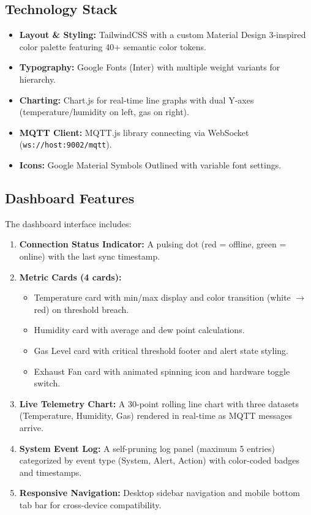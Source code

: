 \documentclass[12pt,a4paper]{report}
\begin{document}
\subsection{Technology Stack}
\begin{itemize}
    \item \textbf{Layout \& Styling:} TailwindCSS with a custom Material Design 3-inspired color palette featuring 40+ semantic color tokens.
    \item \textbf{Typography:} Google Fonts (Inter) with multiple weight variants for hierarchy.
    \item \textbf{Charting:} Chart.js for real-time line graphs with dual Y-axes (temperature/humidity on left, gas on right).
    \item \textbf{MQTT Client:} MQTT.js library connecting via WebSocket (\texttt{ws://host:9002/mqtt}).
    \item \textbf{Icons:} Google Material Symbols Outlined with variable font settings.
\end{itemize}

\subsection{Dashboard Features}
The dashboard interface includes:

\begin{enumerate}
    \item \textbf{Connection Status Indicator:} A pulsing dot (red = offline, green = online) with the last sync timestamp.
    \item \textbf{Metric Cards (4 cards):}
    \begin{itemize}
        \item Temperature card with min/max display and color transition (white $\rightarrow$ red) on threshold breach.
        \item Humidity card with average and dew point calculations.
        \item Gas Level card with critical threshold footer and alert state styling.
        \item Exhaust Fan card with animated spinning icon and hardware toggle switch.
    \end{itemize}
    \item \textbf{Live Telemetry Chart:} A 30-point rolling line chart with three datasets (Temperature, Humidity, Gas) rendered in real-time as MQTT messages arrive.
    \item \textbf{System Event Log:} A self-pruning log panel (maximum 5 entries) categorized by event type (System, Alert, Action) with color-coded badges and timestamps.
    \item \textbf{Responsive Navigation:} Desktop sidebar navigation and mobile bottom tab bar for cross-device compatibility.
\end{enumerate}
\end{document}
